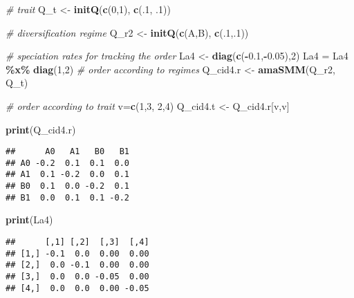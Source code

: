 \documentclass[
]{article}
\newenvironment{Shaded}{\begin{snugshade}}{\end{snugshade}}
\newcommand{\CommentTok}[1]{\textcolor[rgb]{0.56,0.35,0.01}{\textit{#1}}}
\newcommand{\DecValTok}[1]{\textcolor[rgb]{0.00,0.00,0.81}{#1}}
\newcommand{\FloatTok}[1]{\textcolor[rgb]{0.00,0.00,0.81}{#1}}
\newcommand{\FunctionTok}[1]{\textcolor[rgb]{0.13,0.29,0.53}{\textbf{#1}}}
\newcommand{\NormalTok}[1]{#1}
\newcommand{\OtherTok}[1]{\textcolor[rgb]{0.56,0.35,0.01}{#1}}
\newcommand{\SpecialCharTok}[1]{\textcolor[rgb]{0.81,0.36,0.00}{\textbf{#1}}}
\newcommand{\StringTok}[1]{\textcolor[rgb]{0.31,0.60,0.02}{#1}}
\begin{document}
\begin{Shaded}
\begin{Highlighting}[]
\CommentTok{\# trait}
\NormalTok{Q\_t }\OtherTok{\textless{}{-}} \FunctionTok{initQ}\NormalTok{(}\FunctionTok{c}\NormalTok{(}\DecValTok{0}\NormalTok{,}\DecValTok{1}\NormalTok{), }\FunctionTok{c}\NormalTok{(.}\DecValTok{1}\NormalTok{, .}\DecValTok{1}\NormalTok{))}

\CommentTok{\# diversification regime}
\NormalTok{Q\_r2 }\OtherTok{\textless{}{-}} \FunctionTok{initQ}\NormalTok{(}\FunctionTok{c}\NormalTok{(}\StringTok{\textquotesingle{}A\textquotesingle{}}\NormalTok{,}\StringTok{\textquotesingle{}B\textquotesingle{}}\NormalTok{), }\FunctionTok{c}\NormalTok{(.}\DecValTok{1}\NormalTok{,.}\DecValTok{1}\NormalTok{))}


\CommentTok{\# speciation rates for tracking the order}
\NormalTok{La4 }\OtherTok{\textless{}{-}} \FunctionTok{diag}\NormalTok{(}\FunctionTok{c}\NormalTok{(}\SpecialCharTok{{-}}\FloatTok{0.1}\NormalTok{,}\SpecialCharTok{{-}}\FloatTok{0.05}\NormalTok{),}\DecValTok{2}\NormalTok{)}
\NormalTok{La4 }\OtherTok{=}\NormalTok{ La4 }\SpecialCharTok{\%x\%} \FunctionTok{diag}\NormalTok{(}\DecValTok{1}\NormalTok{,}\DecValTok{2}\NormalTok{)}
\CommentTok{\# order according to regimes}
\NormalTok{Q\_cid4.r }\OtherTok{\textless{}{-}} \FunctionTok{amaSMM}\NormalTok{(Q\_r2, Q\_t)}

\CommentTok{\# order according to trait}
\NormalTok{v}\OtherTok{=}\FunctionTok{c}\NormalTok{(}\DecValTok{1}\NormalTok{,}\DecValTok{3}\NormalTok{, }\DecValTok{2}\NormalTok{,}\DecValTok{4}\NormalTok{)}
\NormalTok{Q\_cid4.t }\OtherTok{\textless{}{-}}\NormalTok{ Q\_cid4.r[v,v]}

\FunctionTok{print}\NormalTok{(Q\_cid4.r)}
\end{Highlighting}
\end{Shaded}

\begin{verbatim}
##      A0   A1   B0   B1
## A0 -0.2  0.1  0.1  0.0
## A1  0.1 -0.2  0.0  0.1
## B0  0.1  0.0 -0.2  0.1
## B1  0.0  0.1  0.1 -0.2
\end{verbatim}

\begin{Shaded}
\begin{Highlighting}[]
\FunctionTok{print}\NormalTok{(La4)}
\end{Highlighting}
\end{Shaded}

\begin{verbatim}
##      [,1] [,2]  [,3]  [,4]
## [1,] -0.1  0.0  0.00  0.00
## [2,]  0.0 -0.1  0.00  0.00
## [3,]  0.0  0.0 -0.05  0.00
## [4,]  0.0  0.0  0.00 -0.05
\end{verbatim}
\end{document}
